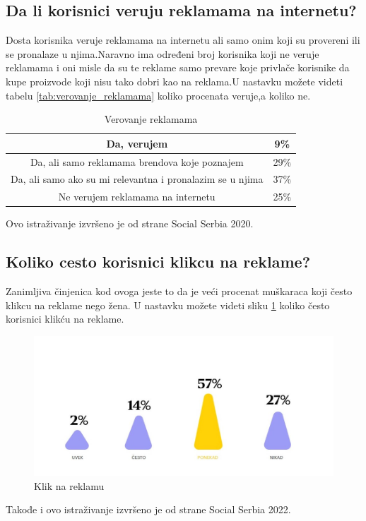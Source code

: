 \documentclass[a4paper]{article}
\begin{document}
	\subsection{Da li korisnici veruju reklamama na internetu?}
	\label{subsec:veovanje_reklamama}
	Dosta korisnika veruje reklamama na internetu ali samo onim koji su provereni ili se pronalaze u njima.Naravno ima određeni broj korisnika koji ne veruje reklamama i oni misle da su te reklame samo prevare koje privlače korisnike da kupe proizvode koji nisu tako dobri kao na reklama.U nastavku možete videti tabelu \ref{tab:verovanje_reklamama} koliko procenata veruje,a koliko ne.
	
	\begin{table}[h!]
		\begin{center}
			\caption{Verovanje reklamama}
			\begin{tabular}{|c|c|} \hline
				Da, verujem&9\%\\ \hline
				Da, ali samo reklamama brendova koje poznajem&29\%\\ \hline
				Da, ali samo ako su mi relevantna i pronalazim se u njima&37\%\\ \hline
				Ne verujem reklamama na internetu&25\%\\ \hline
			\end{tabular}
			\label{tab:tabela1}
		\end{center}
	\end{table}
	
	
	Ovo istraživanje izvršeno je od strane Social Serbia 2020.
	\subsection{Koliko cesto korisnici klikcu na reklame?}
	\label{subsec:klik_na_reklamu}
	Zanimljiva činjenica kod ovoga jeste to da je veći procenat muškaraca koji često klikcu na reklame nego žena. U nastavku možete videti sliku \ref{fig:klik_na_reklamu} koliko često korisnici klikću na reklame.
	
	
	\begin{figure}[h!]
		\begin{center}
			\includegraphics[scale=0.55]{klik_na_reklamu.jpg}
		\end{center}
		\caption{Klik na reklamu}
		\label{fig:klik_na_reklamu}
	\end{figure}
	Takođe i ovo istraživanje izvršeno je od strane Social Serbia 2022.
\end{document}

